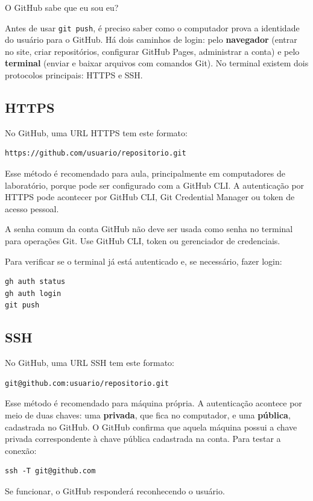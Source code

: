 \documentclass[11pt,a4paper]{article}
\begin{document}
\begin{tcolorbox}[title={PERGUNTA PRINCIPAL}]
O GitHub sabe que eu sou eu?
\end{tcolorbox}

Antes de usar \texttt{git push}, é preciso saber como o computador prova a identidade do usuário para o GitHub. Há dois caminhos de login: pelo \textbf{navegador} (entrar no site, criar repositórios, configurar GitHub Pages, administrar a conta) e pelo \textbf{terminal} (enviar e baixar arquivos com comandos Git). No terminal existem dois protocolos principais: HTTPS e SSH.

\subsection*{HTTPS}
No GitHub, uma URL HTTPS tem este formato:
\begin{lstlisting}
https://github.com/usuario/repositorio.git
\end{lstlisting}
Esse método é recomendado para aula, principalmente em computadores de laboratório, porque pode ser configurado com a GitHub CLI. A autenticação por HTTPS pode acontecer por GitHub CLI, Git Credential Manager ou token de acesso pessoal.

\begin{tcolorbox}[alertbox,title={ATENÇÃO}]
A senha comum da conta GitHub não deve ser usada como senha no terminal para operações Git. Use GitHub CLI, token ou gerenciador de credenciais.
\end{tcolorbox}

Para verificar se o terminal já está autenticado e, se necessário, fazer login:
\begin{lstlisting}
gh auth status
gh auth login
git push
\end{lstlisting}

\subsection*{SSH}
No GitHub, uma URL SSH tem este formato:
\begin{lstlisting}
git@github.com:usuario/repositorio.git
\end{lstlisting}
Esse método é recomendado para máquina própria. A autenticação acontece por meio de duas chaves: uma \textbf{privada}, que fica no computador, e uma \textbf{pública}, cadastrada no GitHub. O GitHub confirma que aquela máquina possui a chave privada correspondente à chave pública cadastrada na conta. Para testar a conexão:
\begin{lstlisting}
ssh -T git@github.com
\end{lstlisting}
Se funcionar, o GitHub responderá reconhecendo o usuário.
\end{document}
